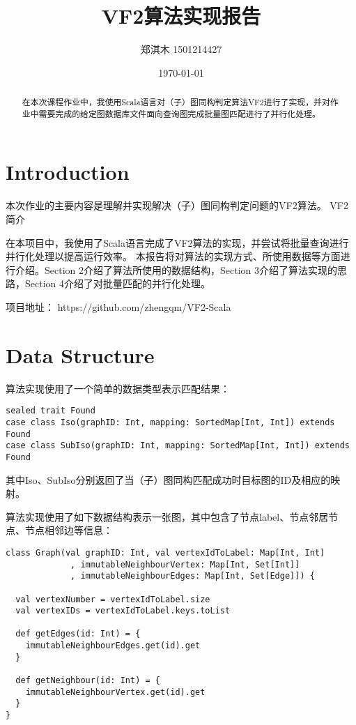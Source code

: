\documentclass{article}
\title{VF2算法实现报告}
\author{郑淇木  1501214427}
\date{\today}
\begin{document}
\maketitle

\begin{abstract}
在本次课程作业中，我使用Scala语言对（子）图同构判定算法VF2进行了实现，并对作业中需要完成的给定图数据库文件面向查询图完成批量图匹配进行了并行化处理。

\end{abstract}


\section{Introduction}
本次作业的主要内容是理解并实现解决（子）图同构判定问题的VF2算法\cite{vf2}。
VF2简介

在本项目中，我使用了Scala语言完成了VF2算法的实现，并尝试将批量查询进行并行化处理以提高运行效率。
本报告将对算法的实现方式、所使用数据等方面进行介绍。Section 2介绍了算法所使用的数据结构，Section 3介绍了算法实现的思路，Section 4介绍了对批量匹配的并行化处理。

项目地址： https://github.com/zhengqm/VF2-Scala

\section{Data Structure}

算法实现使用了一个简单的数据类型表示匹配结果：

\begin{lstlisting}[style=mStyle]
sealed trait Found
case class Iso(graphID: Int, mapping: SortedMap[Int, Int]) extends Found
case class SubIso(graphID: Int, mapping: SortedMap[Int, Int]) extends Found
\end{lstlisting}

其中Iso、SubIso分别返回了当（子）图同构匹配成功时目标图的ID及相应的映射。

算法实现使用了如下数据结构表示一张图，其中包含了节点label、节点邻居节点、节点相邻边等信息：

\begin{lstlisting}[style=mStyle]
class Graph(val graphID: Int, val vertexIdToLabel: Map[Int, Int]
             , immutableNeighbourVertex: Map[Int, Set[Int]]
             , immutableNeighbourEdges: Map[Int, Set[Edge]]) {

  val vertexNumber = vertexIdToLabel.size
  val vertexIDs = vertexIdToLabel.keys.toList

  def getEdges(id: Int) = {
    immutableNeighbourEdges.get(id).get
  }

  def getNeighbour(id: Int) = {
    immutableNeighbourVertex.get(id).get
  }
}
\end{lstlisting}
\end{document}
